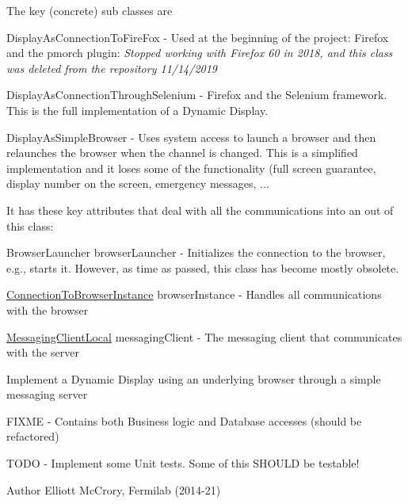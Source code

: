 The key (concrete) sub classes are 
\begin{DoxyItemize}
\item Display\-As\-Connection\-To\-Fire\-Fox -\/ Used at the beginning of the project\-: Firefox and the pmorch plugin\-: {\itshape Stopped working with Firefox 60 in 2018, and this class was deleted from the repository 11/14/2019} 
\item Display\-As\-Connection\-Through\-Selenium -\/ Firefox and the Selenium framework. This is the full implementation of a Dynamic Display. 
\item Display\-As\-Simple\-Browser -\/ Uses system access to launch a browser and then relaunches the browser when the channel is changed. This is a simplified implementation and it loses some of the functionality (full screen guarantee, display number on the screen, emergency messages, ... 





It has these key attributes that deal with all the communications into an out of this class\-: 
\begin{DoxyEnumerate}
\item Browser\-Launcher browser\-Launcher -\/ Initializes the connection to the browser, e.\-g., starts it. However, as time as passed, this class has become mostly obsolete. 
\item \hyperlink{classgov_1_1fnal_1_1ppd_1_1dd_1_1display_1_1client_1_1ConnectionToBrowserInstance}{Connection\-To\-Browser\-Instance} browser\-Instance -\/ Handles all communications with the browser 
\item \hyperlink{classgov_1_1fnal_1_1ppd_1_1dd_1_1display_1_1client_1_1DisplayControllerMessagingAbstract_1_1MessagingClientLocal}{Messaging\-Client\-Local} messaging\-Client -\/ The messaging client that communicates with the server 
\end{DoxyEnumerate}



Implement a Dynamic Display using an underlying browser through a simple messaging server

F\-I\-X\-M\-E -\/ Contains both Business logic and Database accesses (should be refactored)

T\-O\-D\-O -\/ Implement some Unit tests. Some of this S\-H\-O\-U\-L\-D be testable!

\begin{DoxyAuthor}{Author}
Elliott Mc\-Crory, Fermilab (2014-\/21) 
\end{DoxyAuthor}


\end{DoxyItemize}
